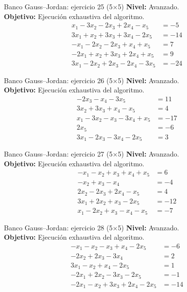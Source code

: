 \documentclass[aspectratio=169,9pt]{beamer}
\theoremstyle{remark}
\begin{document}
\begin{frame}[t]{Banco Gauss--Jordan: ejercicio 25 (5$\times$5)}
\textbf{Nivel:} Avanzado.\\
\textbf{Objetivo:} Ejecución exhaustiva del algoritmo.
\[
\begin{aligned}
x_{1} - 3 x_{2} - 2 x_{3} + 2 x_{4} - x_{5} &= -5\\
3 x_{1} + x_{2} + 3 x_{3} + 3 x_{4} - 2 x_{5} &= -14\\
- x_{1} - 2 x_{2} - 2 x_{3} + x_{4} + x_{5} &= 7\\
- 2 x_{1} + x_{2} + 3 x_{3} + 2 x_{4} + x_{5} &= 9\\
3 x_{1} - 2 x_{2} + 2 x_{3} - 2 x_{4} - 3 x_{5} &= -24
\end{aligned}
\]
\end{frame}
\begin{frame}[t]{Banco Gauss--Jordan: ejercicio 26 (5$\times$5)}
\textbf{Nivel:} Avanzado.\\
\textbf{Objetivo:} Ejecución exhaustiva del algoritmo.
\[
\begin{aligned}
- 2 x_{3} - x_{4} - 3 x_{5} &= 11\\
3 x_{2} + 3 x_{3} + x_{4} - x_{5} &= 4\\
x_{1} - 3 x_{2} - x_{3} - 3 x_{4} + x_{5} &= -17\\
2 x_{5} &= -6\\
3 x_{1} - 2 x_{3} - 3 x_{4} - 2 x_{5} &= 3
\end{aligned}
\]
\end{frame}
\begin{frame}[t]{Banco Gauss--Jordan: ejercicio 27 (5$\times$5)}
\textbf{Nivel:} Avanzado.\\
\textbf{Objetivo:} Ejecución exhaustiva del algoritmo.
\[
\begin{aligned}
- x_{1} - x_{2} + x_{3} + x_{4} + x_{5} &= 6\\
- x_{2} + x_{3} - x_{4} &= -4\\
2 x_{2} - 2 x_{3} + 2 x_{4} - x_{5} &= 4\\
3 x_{1} + 2 x_{2} + x_{3} - 2 x_{5} &= -12\\
x_{1} - 2 x_{2} + x_{3} - x_{4} - x_{5} &= -7
\end{aligned}
\]
\end{frame}
\begin{frame}[t]{Banco Gauss--Jordan: ejercicio 28 (5$\times$5)}
\textbf{Nivel:} Avanzado.\\
\textbf{Objetivo:} Ejecución exhaustiva del algoritmo.
\[
\begin{aligned}
- x_{1} - x_{2} - x_{3} + x_{4} - 2 x_{5} &= -6\\
- 2 x_{2} + 2 x_{3} - 3 x_{4} &= 2\\
3 x_{1} - x_{2} + x_{4} - 2 x_{5} &= 1\\
- 2 x_{1} + 2 x_{2} - 3 x_{3} - 2 x_{5} &= -1\\
- 2 x_{1} - x_{2} + 3 x_{3} + 2 x_{4} - 2 x_{5} &= -14
\end{aligned}
\]
\end{frame}
\end{document}
